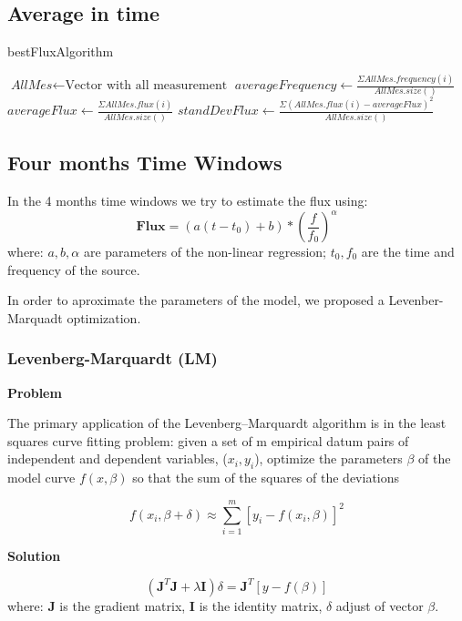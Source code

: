 \documentclass[10pt]{article}
\begin{document}
\subsection{Average in time}
\begin{algorithm}[H]
\caption{bestFluxAlgorithm}\label{4months}
\begin{algorithmic}[1]
\State $\textit{AllMes} \gets \text{Vector with all measurement}$
\Statex
\State $\textit{averageFrequency} \gets \frac{\Sigma AllMes.frequency(i)}{AllMes.size()}$
\Statex
\State $\textit{averageFlux} \gets \frac{\Sigma AllMes.flux(i)}{AllMes.size()}$
\Statex
\State $\textit{standDevFlux} \gets \frac{\Sigma (AllMes.flux(i) - averageFlux)^2}{AllMes.size()}$
\Statex
\State {}
\EndProcedure
\end{algorithmic}
\end{algorithm}

\subsection{Four months Time Windows}
In the 4 months time windows we try to estimate the flux using:
$$ \mathbf{Flux} = (a(t-t_0)+b)*\left(\frac{f}{f_0}\right)^\alpha $$
where: $a,b,\alpha$ are parameters of the non-linear regression; $t_0, f_0$ are
the time and frequency of the source.

In order to aproximate the parameters of the model, we proposed a
Levenber-Marquadt optimization. 

\subsubsection{Levenberg-Marquardt (LM)}
\textbf{Problem} 

The primary application of the Levenberg–Marquardt algorithm is in the least
squares curve fitting problem: given a set of m empirical datum pairs of
independent and dependent variables, ($x_i, y_i$), optimize the parameters
$\beta$ of the model curve $f(x,\beta)$ so that the sum of the squares of the
deviations

$$ f(x_i, \beta + \delta) \approx \sum\limits_{i=1}^m [y_i - f(x_i, \beta)]^2 $$

\noindent\textbf{Solution} 

$$ (\mathbf{J}^{T}\mathbf{J} + \lambda\mathbf{I})\delta = \mathbf{J}^{T}[y - f(\beta)] $$
where: $\mathbf{J}$ is the gradient matrix, $\mathbf{I}$ is the identity matrix, $\delta$ adjust of vector $\beta$.
\end{document}
